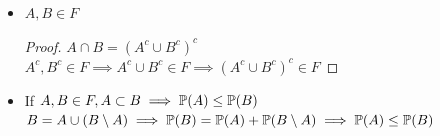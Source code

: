 \begin{exercise}
\phantom{text}
\begin{itemize}
    \item $A,B \in F$
    \begin{proof}
        $A\cap B = (A^c \cup B^c)^c$\\
        $A^c, B^c \in F \implies A^c \cup B^c \in F \implies (A^c \cup B^c)^c \in F$
    \end{proof}
    \item If $A,B \in F, A \subset B \implies \P(A) \leq \P(B)$\\
    $B=A\cup(B \setminus A) \implies \P(B)=\P(A)+\P(B\setminus A) \implies \P(A)\leq\P(B)$
\end{itemize}
\end{exercise}